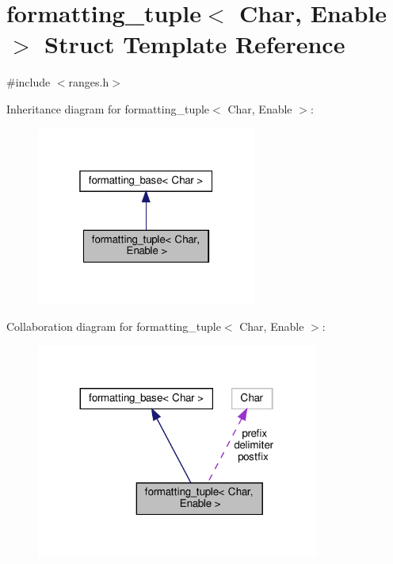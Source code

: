 \hypertarget{structformatting__tuple}{}\section{formatting\+\_\+tuple$<$ Char, Enable $>$ Struct Template Reference}
\label{structformatting__tuple}


{\ttfamily \#include $<$ranges.\+h$>$}



Inheritance diagram for formatting\+\_\+tuple$<$ Char, Enable $>$\+:
\nopagebreak
\begin{figure}[H]
\begin{center}
\leavevmode
\includegraphics[width=205pt]{structformatting__tuple__inherit__graph}
\end{center}
\end{figure}


Collaboration diagram for formatting\+\_\+tuple$<$ Char, Enable $>$\+:
\nopagebreak
\begin{figure}[H]
\begin{center}
\leavevmode
\includegraphics[width=263pt]{structformatting__tuple__coll__graph}
\end{center}
\end{figure}
